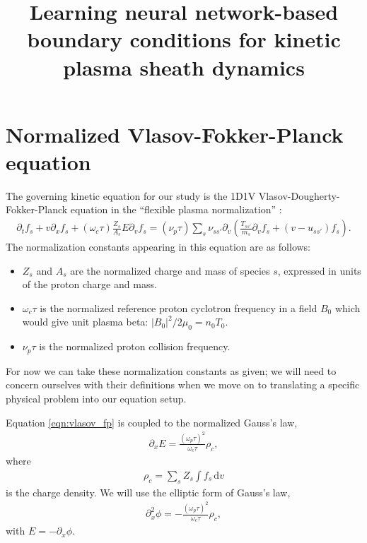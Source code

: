 \documentclass{article}
\title{Learning neural network-based boundary conditions for kinetic plasma sheath dynamics}
\begin{document}
\maketitle

\section{Normalized Vlasov-Fokker-Planck equation}

The governing kinetic equation for our study is the 1D1V Vlasov-Dougherty-Fokker-Planck equation in
the ``flexible plasma normalization'' \cite{millerMultispecies13momentModel2016}:
\begin{align}
    \label{eqn:vlasov_fp}
    \partial_t f_s + v \partial_x f_s + (\omega_c \tau) \frac{Z_s}{A_s} E \partial_v f_s = (\nu_p \tau) \sum_s \nu_{s s'} \partial_v \left( \frac{T_{s s'}}{m_s} \partial_v f_s + (v - u_{s s'}) f_s \right).
\end{align}
The normalization constants appearing in this equation are as follows:
\begin{itemize}
    \item $Z_s$ and $A_s$ are the normalized charge and mass of species $s$, expressed in units of the proton charge and mass.
    \item $\omega_c \tau$ is the normalized reference proton cyclotron frequency in a field $B_0$ which would give unit plasma beta: $|B_0|^2 / 2 \mu_0 = n_0 T_0$.
    \item $\nu_p \tau$ is the normalized proton collision frequency.
\end{itemize}
For now we can take these normalization constants as given; we will need to concern ourselves with their definitions when we
move on to translating a specific physical problem into our equation setup.

Equation \eqref{eqn:vlasov_fp} is coupled to the normalized Gauss's law,
\begin{align}
\partial_x E = \frac{(\omega_p \tau)^2}{\omega_c \tau} \rho_c,
\end{align}
where
\begin{align}
    \rho_c = \sum_s Z_s \int f_s \,\mathrm{d} v
\end{align}
is the charge density.
We will use the elliptic form of Gauss's law,
\begin{align}
\partial_x^2 \phi = -\frac{(\omega_p \tau)^2}{\omega_c \tau} \rho_c,
\end{align}
with $E = -\partial_x \phi$.
\end{document}
